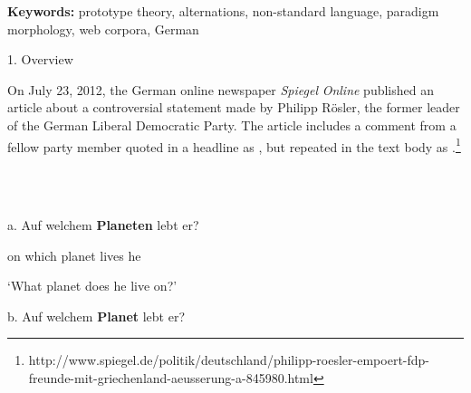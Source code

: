 \begin{styleMoutonAbstract}
\textbf{Keywords:} prototype theory, alternations, non-standard language, paradigm morphology, web corpora, German
\end{styleMoutonAbstract}

\begin{styleMoutonHeadingi}
1. Overview
\end{styleMoutonHeadingi}

\begin{styleMoutonTextBeforeExample}
On July 23, 2012, the German online newspaper \textit{Spiegel} \textit{Online} published an article about a controversial statement made by Philipp Rösler, the former leader of the German Liberal Democratic Party. The article includes a comment from a fellow party member quoted in a headline as , but repeated in the text body as .\footnote{http://www.spiegel.de/politik/deutschland/philipp-roesler-empoert-fdp-freunde-mit-griechenland-aeusserung-a-845980.html}
\end{styleMoutonTextBeforeExample}

\begin{styleMoutonExample}
\ea%
    \label{ex:key:1}
    \gll\\
        \\
    \glt
    \z

          a.  Auf  welchem  \textbf{Planeten}  lebt  er? 
\end{styleMoutonExample}

\begin{styleMoutonExampleAlphaGloss}
on  which  planet  lives  he
\end{styleMoutonExampleAlphaGloss}

\begin{styleMoutonExampleAlphaGloss}
‘What planet does he live on?’
\end{styleMoutonExampleAlphaGloss}

\begin{styleMoutonExampleAlpha}
b.  Auf  welchem  \textbf{Planet}  lebt  er?
\end{styleMoutonExampleAlpha}

